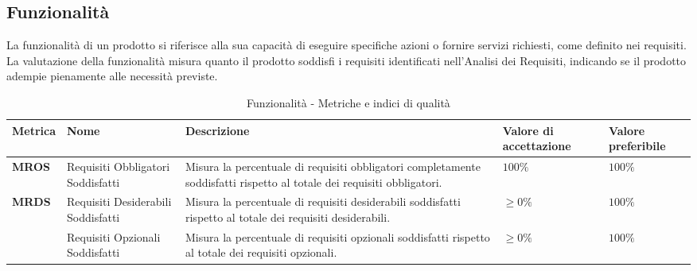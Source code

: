 \subsection{Funzionalità}
La funzionalità di un prodotto si riferisce alla sua capacità di eseguire specifiche azioni o fornire servizi richiesti, come definito nei requisiti. La valutazione della funzionalità misura quanto il prodotto soddisfi i requisiti identificati nell'Analisi dei Requisiti, indicando se il prodotto adempie pienamente alle necessità previste.
\begin{table}[H]
    \centering
    \begin{tabular}{|C{1.5cm}|L{3cm}|L{4cm}|L{2.5cm}|L{2.5cm}|}
        \hline
        \textbf{Metrica} & \textbf{Nome} & \textbf{Descrizione} & \textbf{Valore di accettazione} & \textbf{Valore preferibile} \\
        \hline
        \textbf{MROS} & Requisiti Obbligatori Soddisfatti & Misura la percentuale di requisiti obbligatori completamente soddisfatti rispetto al totale dei requisiti obbligatori. & $100\%$ & $100\%$ \\
        \hline
        \textbf{MRDS} & Requisiti Desiderabili Soddisfatti & Misura la percentuale di requisiti desiderabili soddisfatti rispetto al totale dei requisiti desiderabili. & $\geq 0\%$ & $ 100\%$ \\
        \hline
        \textbf{} & Requisiti Opzionali Soddisfatti & Misura la percentuale di requisiti opzionali soddisfatti rispetto al totale dei requisiti opzionali. & $\geq 0\%$ & $ 100\%$ \\
        \hline
    \end{tabular}
    \caption{Funzionalità - Metriche e indici di qualità}
    \label{tab:funzionalità_qualita_prodotto}
\end{table}
